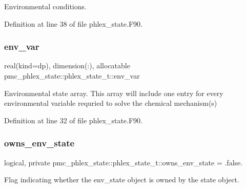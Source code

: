 Environmental conditions. 



Definition at line 38 of file phlex\+\_\+state.\+F90.

\mbox{\label{structpmc__phlex__state_1_1phlex__state__t_afabdbb41ae2bcb87f8dcf4fec7bf6811}} 
\subsubsection{\texorpdfstring{env\+\_\+var}{env\_var}}
{\footnotesize\ttfamily real(kind=dp), dimension(\+:), allocatable pmc\+\_\+phlex\+\_\+state\+::phlex\+\_\+state\+\_\+t\+::env\+\_\+var\hspace{0.3cm}{\ttfamily [private]}}



Environmental state array. This array will include one entry for every environmental variable requried to solve the chemical mechanism(s) 



Definition at line 32 of file phlex\+\_\+state.\+F90.

\mbox{\label{structpmc__phlex__state_1_1phlex__state__t_a0ca66efd1f34ad83178d2b75d418c5ef}} 
\subsubsection{\texorpdfstring{owns\+\_\+env\+\_\+state}{owns\_env\_state}}
{\footnotesize\ttfamily logical, private pmc\+\_\+phlex\+\_\+state\+::phlex\+\_\+state\+\_\+t\+::owns\+\_\+env\+\_\+state = .false.\hspace{0.3cm}{\ttfamily [private]}}



Flag indicating whether the env\+\_\+state object is owned by the state object. 



